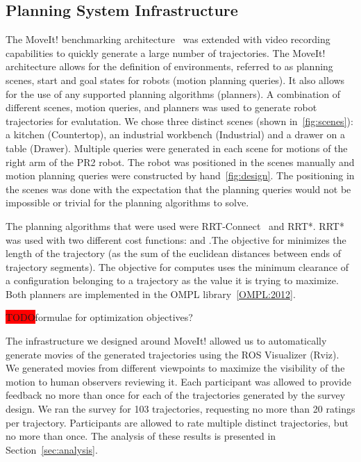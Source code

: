\documentclass[letterpaper, 10 pt, conference]{ieeeconf}  %
\newcommand{\todo}{\colorbox{red}{TODO}}
\begin{document}
\subsection{Planning System Infrastructure}

The MoveIt! benchmarking architecture~\cite{cohen2012generic} was extended with video recording capabilities to quickly generate a large number of trajectories. The MoveIt! architecture allows for the definition of environments, referred to as planning scenes, start and goal states for robots (motion planning queries). It also allows for the use of any supported planning algorithms (planners). A combination of different scenes, motion queries, and planners was used to generate robot trajectories for evalutation. We chose three distinct scenes (shown in~\ref{fig:scenes}): a kitchen ({\sc Countertop}), an industrial workbench ({\sc Industrial}) and a drawer on a table ({\sc Drawer}). Multiple queries were generated in each scene for motions of the right arm of the PR2 robot. The robot was positioned in the scenes manually and motion planning queries were constructed by hand~\ref{fig:design}. The positioning in the scenes was done with the expectation that the planning queries would not be impossible or trivial for the planning algorithms to solve. 


The planning algorithms that were used were RRT-Connect~\cite{kuffner2000rrt} and RRT*.  RRT*~\cite{frazzoli-RRTstar} was used with two different cost functions:  and .The objective for  minimizes the length of the trajectory (as the sum of the euclidean distances between ends of trajectory segments). The objective for  computes uses the minimum clearance of a configuration belonging to a trajectory as the value it is trying to maximize. Both planners are implemented in the OMPL library~\ref{OMPL:2012}. 

\todo formulae for optimization objectives?

The infrastructure we designed around MoveIt! allowed us to automatically generate movies of the generated trajectories using the ROS Visualizer (Rviz). We generated movies from different viewpoints to maximize the visibility of the motion to human observers reviewing it. Each participant was allowed to provide feedback no more than once for each of the trajectories generated by the survey design. We ran the survey for 103 trajectories, requesting no more than 20 ratings per trajectory. Participants are allowed to rate multiple distinct trajectories, but no more than once. The analysis of these results is presented in Section~\ref{sec:analysis}.
\end{document}
